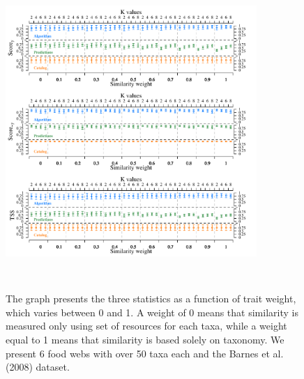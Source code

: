 \documentclass[letterpaper]{article}
\begin{document}
\newpage
    \begin{figure}[h]
      \centering\includegraphics[width=0.85\textwidth, height=12cm]{multiple_parameters2.pdf}
      \caption{The graph presents the three statistics as a function of trait weight, which varies between 0 and 1. A weight of 0 means that similarity is measured only using set of resources for each taxa, while a weight equal to 1 means that similarity is based solely on taxonomy. We present 6 food webs with over 50 taxa each and the Barnes et al. (2008) dataset.}
      \label{fig:multi_param}
    \end{figure}
\end{document}
